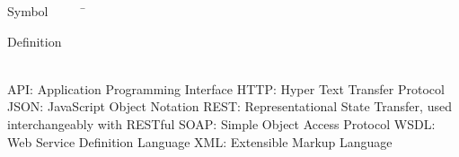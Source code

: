 

\begin{tabbing}
Symbol~~~~~\= \ \ \ \ \ \ \ \ \ \ \ \ \ \ \ \ \ \ \ \ \ \ \ \ \ \ \ \ \ \ \ \ \ \ \ \  \parbox{5in}{Definition}\\

\addsymbol \mbox{API}: {Application Programming Interface}
\addsymbol \mbox{HTTP}: {Hyper Text Transfer Protocol}
\addsymbol \mbox{JSON}: {JavaScript Object Notation}
\addsymbol \mbox{REST}: {Representational State Transfer, used interchangeably with RESTful}
\addsymbol \mbox{SOAP}: {Simple Object Access Protocol}
\addsymbol \mbox{WSDL}: {Web Service Definition Language}
\addsymbol \mbox{XML}: {Extensible Markup Language}





\end{tabbing}

